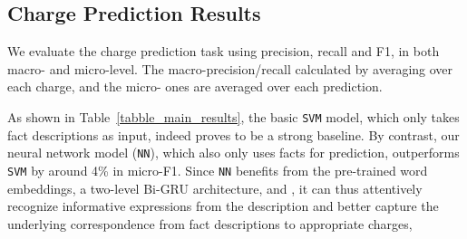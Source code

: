 

\subsection{Charge Prediction Results}
\label{sec_main_results}
We evaluate the charge prediction task using precision, recall and F1, in both macro- and micro-level.
The macro-precision/recall  calculated by averaging over %
each charge, and the micro- ones are averaged  over each prediction. %



As shown in Table~\ref{tabble_main_results}, %
the basic \texttt{SVM} model,
which only takes fact descriptions as input, indeed proves to be a strong baseline.
By contrast, our  neural network model (\texttt{NN}), which also only uses facts for prediction, outperforms \texttt{SVM} 
by around 4\% in micro-F1.
Since \texttt{NN} benefits from the pre-trained word embeddings,
a two-level Bi-GRU architecture, and ,
it can thus attentively recognize informative expressions from the description and 
better capture the underlying correspondence from fact descriptions to appropriate charges,
%

